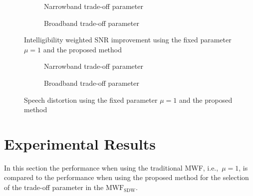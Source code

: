 \documentclass{article}
\begin{document}
\begin{figure*}%
\centering
\begin{subfigure}{\columnwidth}
  \vspace{-0.2cm}
  \caption{Narrowband trade-off parameter}%
  \label{subfig: snrn}%
\end{subfigure}\hfill%
\begin{subfigure}{\columnwidth}
  \vspace{-0.2cm}
  \caption{Broadband trade-off parameter}%
  \label{subfig: snrb}%
\end{subfigure}
\vspace{-0.2cm}
\caption{Intelligibility weighted SNR improvement using the fixed parameter $\mu = 1$ and the proposed method}
\label{fig: snr}
\vspace{-0.1cm}
\end{figure*}%
\begin{figure*}%
\centering
\begin{subfigure}{\columnwidth}
  \vspace{-0.2cm}
  \caption{Narrowband trade-off parameter}%
  \label{subfig: sdn}%
\end{subfigure}\hfill%
\begin{subfigure}{\columnwidth}
  \vspace{-0.2cm}
  \caption{Broadband trade-off parameter}%
  \label{subfig: sdb}%
\end{subfigure}
\vspace{-0.2cm}
\caption{Speech distortion using the fixed parameter $\mu = 1$ and the proposed method}
\vspace{-0.4cm}
\label{fig: sd}
\end{figure*}

\vspace{-0.25cm}
\section{Experimental Results}
\label{sec: exp}
In this section the performance when using the traditional MWF, i.e.,~$\mu=1$, is compared to the performance when using the proposed method for the selection of the trade-off parameter in the $\text{MWF}_{\text{SDW}}$.
\end{document}
